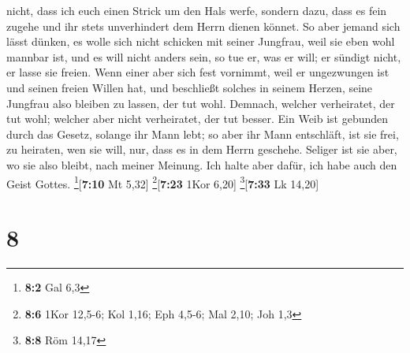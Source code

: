 nicht, dass ich euch einen Strick um den Hals werfe, sondern dazu, dass
es fein zugehe und ihr stets unverhindert dem Herrn dienen könnet.
 So aber jemand sich lässt dünken, es wolle sich nicht
schicken mit seiner Jungfrau, weil sie eben wohl mannbar ist, und es
will nicht anders sein, so tue er, was er will; er sündigt nicht, er
lasse sie freien.  Wenn einer aber sich fest vornimmt,
weil er ungezwungen ist und seinen freien Willen hat, und beschließt
solches in seinem Herzen, seine Jungfrau also bleiben zu lassen, der tut
wohl.  Demnach, welcher verheiratet, der tut wohl;
welcher aber nicht verheiratet, der tut besser.  Ein Weib
ist gebunden durch das Gesetz, solange ihr Mann lebt; so aber ihr Mann
entschläft, ist sie frei, zu heiraten, wen sie will, nur, dass es in dem
Herrn geschehe.  Seliger ist sie aber, wo sie also
bleibt, nach meiner Meinung. Ich halte aber dafür, ich habe auch den
Geist Gottes. \footnote{\textbf{8:2} Gal 6,3}{[}\textbf{7:10} Mt 5,32{]}
\footnote{\textbf{8:6} 1Kor 12,5-6; Kol 1,16; Eph 4,5-6; Mal 2,10; Joh
  1,3}{[}\textbf{7:23} 1Kor 6,20{]} \footnote{\textbf{8:8} Röm 14,17}{[}\textbf{7:33}
Lk 14,20{]}

\hypertarget{section-7}{%
\section{8}\label{section-7}}

